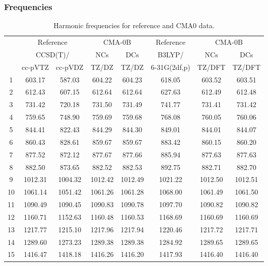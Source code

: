 \documentclass[10pt,oneside]{article}
\begin{document}
\subsubsection*{Frequencies}
\begin{table}[h!]
\centering
\caption{Harmonic frequencies for reference and CMA0 data.}
\begin{tabular}{cccccccc}
\toprule
{} & \multicolumn{2}{c}{Reference} & \multicolumn{2}{c}{CMA-0B} &    Reference & \multicolumn{2}{c}{CMA-0B} \\
{} & \multicolumn{2}{c}{CCSD(T)/} &     NCs &     DCs &       B3LYP/ &     NCs &     DCs \\
{} &   cc-pVTZ & cc-pVDZ &   TZ/DZ &   TZ/DZ & 6-31G(2df,p) &  TZ/DFT &  TZ/DFT \\
\midrule
1  &    603.17 &  587.03 &  604.22 &  604.23 &       618.05 &  603.52 &  603.51 \\
2  &    612.43 &  607.15 &  612.64 &  612.64 &       627.63 &  612.49 &  612.48 \\
3  &    731.42 &  720.18 &  731.50 &  731.49 &       741.77 &  731.41 &  731.42 \\
4  &    759.65 &  748.90 &  759.69 &  759.68 &       768.08 &  760.05 &  760.06 \\
5  &    844.41 &  822.43 &  844.29 &  844.30 &       849.01 &  844.01 &  844.07 \\
6  &    860.43 &  828.61 &  859.67 &  859.67 &       883.42 &  860.15 &  860.20 \\
7  &    877.52 &  872.12 &  877.67 &  877.66 &       885.94 &  877.63 &  877.63 \\
8  &    882.50 &  873.65 &  882.52 &  882.53 &       892.75 &  882.71 &  882.70 \\
9  &   1012.31 & 1004.32 & 1012.42 & 1012.49 &      1021.22 & 1012.50 & 1012.51 \\
10 &   1061.14 & 1051.42 & 1061.26 & 1061.28 &      1068.00 & 1061.49 & 1061.50 \\
11 &   1090.49 & 1090.45 & 1090.83 & 1090.78 &      1097.70 & 1090.82 & 1090.82 \\
12 &   1160.71 & 1152.63 & 1160.48 & 1160.53 &      1168.69 & 1160.69 & 1160.69 \\
13 &   1217.77 & 1215.10 & 1217.96 & 1217.94 &      1220.46 & 1217.72 & 1217.71 \\
14 &   1289.60 & 1273.23 & 1289.38 & 1289.38 &      1284.92 & 1289.65 & 1289.65 \\
15 &   1416.47 & 1418.18 & 1416.26 & 1416.20 &      1417.93 & 1416.40 & 1416.40 \\

\end{tabular}
\end{table}
\end{document}
